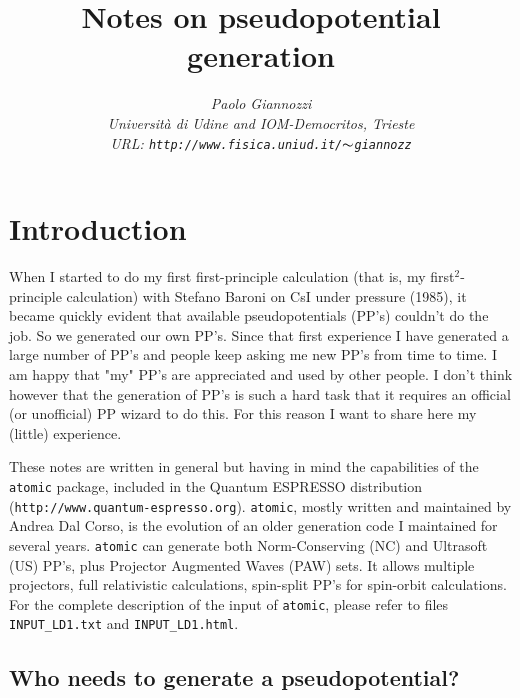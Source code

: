 \documentclass[12pt,a4paper]{article}
\begin{document}
 
\title{Notes on pseudopotential generation}
\author{\em Paolo Giannozzi\\
Universit\`a di Udine and IOM-Democritos, Trieste\\
URL: {\tt http://www.fisica.uniud.it/$\thicksim$giannozz}}
\maketitle
\date
\tableofcontents

\section{Introduction} 

When I started to do my first first-principle calculation
(that is, my first$^2$-principle calculation) with Stefano Baroni
on CsI under pressure (1985), it became quickly evident that
available pseudopotentials (PP's) couldn't do the job. So we 
generated our own PP's. Since that first experience I have 
generated a large number of PP's and people keep asking me 
new PP's from time to time. I am happy that "my" PP's are 
appreciated and used by other people. I don't think however 
that the generation of PP's is such a hard task that it requires 
an official (or unofficial) PP wizard to do this. For this reason 
I want to share here my (little) experience.

These notes are written in general but having in mind the capabilities of
the {\tt atomic} package, included in the {\sc Quantum ESPRESSO} distribution 
(\texttt{http://www.quantum-espresso.org}). {\tt atomic}, mostly written
and maintained by Andrea Dal Corso, is the evolution of an older generation 
code I maintained for several years. {\tt atomic} can generate both 
Norm-Conserving (NC) \cite{NC} and Ultrasoft (US) \cite{van} PP's,
plus Projector Augmented Waves (PAW) \cite{PAW} sets.
It allows multiple projectors, full relativistic calculations,
spin-split PP's for spin-orbit calculations.
For the complete description of the input of \texttt{atomic},
please refer to files \texttt{INPUT\_LD1.txt} and 
\texttt{INPUT\_LD1.html}.

\subsection{Who needs to generate a pseudopotential?}
\end{document}
